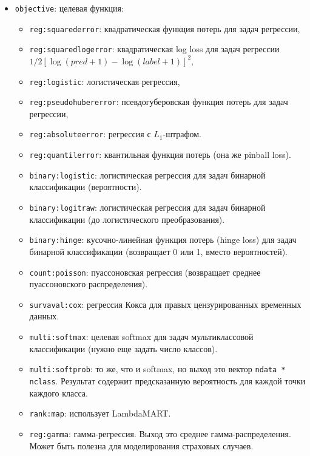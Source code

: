 \documentclass[%
	11pt,
	a4paper,
	utf8,
		]{article}
\begin{document}
\begin{itemize}
	\item \verb|objective|: целевая функция:
	\begin{itemize}
		\item \verb|reg:squarederror|: квадратическая функция потерь для задач регрессии,
		
		\item \verb|reg:squaredlogerror|: квадратическая log loss для задач регрессии $ 1/2 [\log (pred + 1) - \log (label + 1)]^2 $,
		
		\item \verb|reg:logistic|: логистическая регрессия,
		
		\item \verb|reg:pseudohubererror|: псевдогуберовская функция потерь для задач регрессии,
		
		\item \verb|reg:absoluteerror|: регрессия с $ L_1 $-штрафом. 
		
		\item \verb|reg:quantilerror|: квантильная функция потерь (она же pinball loss).
		
		\item \verb|binary:logistic|: логистическая регрессия для задач бинарной классификации (вероятности).
		
		\item \verb|binary:logitraw|: логистическая регрессия для задач бинарной классификации (до логистического преобразования).
		
		\item \verb|binary:hinge|: кусочно-линейная функция потерь (hinge loss) для задач бинарной классификации (возвращает 0 или 1, вместо вероятностей).
		
		\item \verb|count:poisson|: пуассоновская регрессия (возвращает среднее пуассоновского распределения).
		
		\item \verb|survaval:cox|: регрессия Кокса для правых цензурированных временных данных.
		
		\item \verb|multi:softmax|: целевая softmax для задач мультиклассовой классификации (нужно еще задать число классов).
		
		\item \verb|multi:softprob|: то же, что и softmax, но выход это вектор \verb|ndata * nclass|. Результат содержит предсказанную вероятность для каждой точки каждого класса.
		
		\item \verb|rank:map|: использует LambdaMART.
		
		\item \verb|reg:gamma|: гамма-регрессия. Выход это среднее гамма-распределения. Может быть полезна для моделирования страховых случаев.
	\end{itemize}
\end{itemize}
\end{document}
